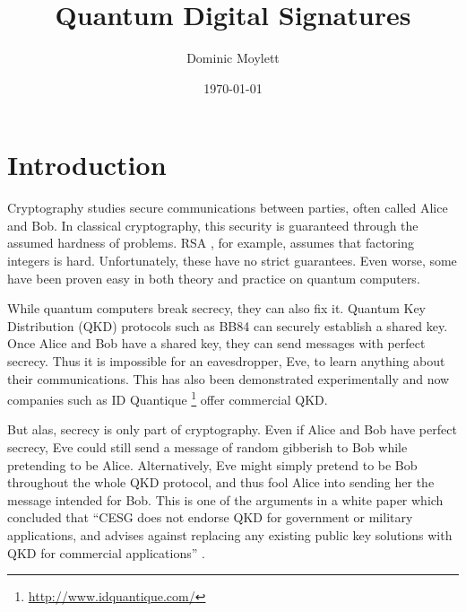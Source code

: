 \documentclass[%
 reprint,
 amsmath,amssymb,
 aps,
 pra,
]{revtex4-1}
\begin{document}
\title{Quantum Digital Signatures}

\author{Dominic Moylett}
%

\date{\today}%

\maketitle


\section{Introduction}
\label{sec:intro}

Cryptography studies secure communications between parties, often called Alice and Bob. In classical cryptography, this security is guaranteed through the assumed hardness of problems. RSA \cite{Rivest:1978:MOD:359340.359342}, for example, assumes that factoring integers is hard. Unfortunately, these have no strict guarantees. Even worse, some have been proven easy in both theory \cite{Shor97} and practice \cite{MLL+12, 1604.05796} on quantum computers.

While quantum computers break secrecy, they can also fix it. Quantum Key Distribution (QKD) protocols such as BB84 \citep{BB84} can securely establish a shared key. Once Alice and Bob have a shared key, they can send messages with perfect secrecy. Thus it is impossible for an eavesdropper, Eve, to learn anything about their communications. This has also been demonstrated experimentally \cite{Bennett1992, Sibson:15} and now companies such as ID Quantique \footnote{\url{http://www.idquantique.com/}} offer commercial QKD.

But alas, secrecy is only part of cryptography. Even if Alice and Bob have perfect secrecy, Eve could still send a message of random gibberish to Bob while pretending to be Alice. Alternatively, Eve might simply pretend to be Bob throughout the whole QKD protocol, and thus fool Alice into sending her the message intended for Bob. This is one of the arguments in a white paper which concluded that ``CESG does not endorse QKD for government or military applications, and advises against replacing any existing public key solutions with QKD for commercial applications'' \cite{CESG16}.
\end{document}
